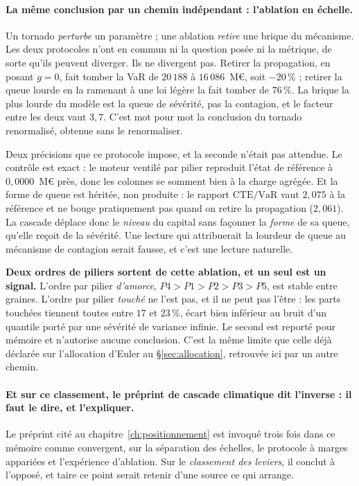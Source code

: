 \paragraph{La même conclusion par un chemin indépendant : l'ablation en échelle.} Un tornado
\emph{perturbe} un paramètre ; une ablation \emph{retire} une brique du mécanisme. Les deux
protocoles n'ont en commun ni la question posée ni la métrique, de sorte qu'ils peuvent
diverger. Ils ne divergent pas. Retirer la propagation, en posant $g=0$,
fait tomber la VaR de $20\,188$ à $16\,086$~M\euro, soit $-20\,\%$ ; retirer la queue lourde en
la ramenant à une loi légère la fait tomber de $76\,\%$. La brique la plus lourde du
modèle est la queue de sévérité, pas la contagion, et le facteur entre les deux vaut $3{,}7$.
C'est mot pour mot la conclusion du tornado renormalisé, obtenue sans le renormaliser.

Deux précisions que ce protocole impose, et la seconde n'était pas attendue. Le contrôle est
exact : le moteur ventilé par pilier reproduit l'état de référence à $0{,}0000$~M\euro{} près,
donc les colonnes se somment bien à la charge agrégée. Et la forme de queue est héritée,
non produite : le rapport $\mathrm{CTE}/\mathrm{VaR}$ vaut $2{,}075$ à la référence et ne bouge
pratiquement pas quand on retire la propagation ($2{,}061$). La cascade déplace donc le
\emph{niveau} du capital sans façonner la \emph{forme} de sa queue, qu'elle reçoit de la
sévérité. Une lecture qui attribuerait la lourdeur de queue au mécanisme de contagion serait
fausse, et c'est une lecture naturelle.

\begin{attention}
\textbf{Deux ordres de piliers sortent de cette ablation, et un seul est un signal.} L'ordre par
pilier \emph{d'amorce}, $P4 > P1 > P2 > P3 > P5$, est stable entre graines. L'ordre par pilier
\emph{touché} ne l'est pas, et il ne peut pas l'être : les parts touchées tiennent toutes entre
$17$ et $23\,\%$, écart bien inférieur au bruit d'un quantile porté par une sévérité de variance
infinie. Le second est reporté pour mémoire et n'autorise aucune conclusion. C'est la même
limite que celle déjà déclarée sur l'allocation d'Euler au \S\ref{sec:allocation}, retrouvée ici
par un autre chemin.
\end{attention}

\paragraph{Et sur ce classement, le préprint de cascade climatique dit l'inverse : il faut le
dire, et l'expliquer.} Le préprint cité au chapitre~\ref{ch:positionnement} est invoqué trois fois
dans ce mémoire comme convergent, sur la séparation des échelles, le protocole à marges appariées
et l'expérience d'ablation. Sur le \emph{classement des leviers}, il conclut à l'opposé, et taire
ce point serait retenir d'une source ce qui arrange.

